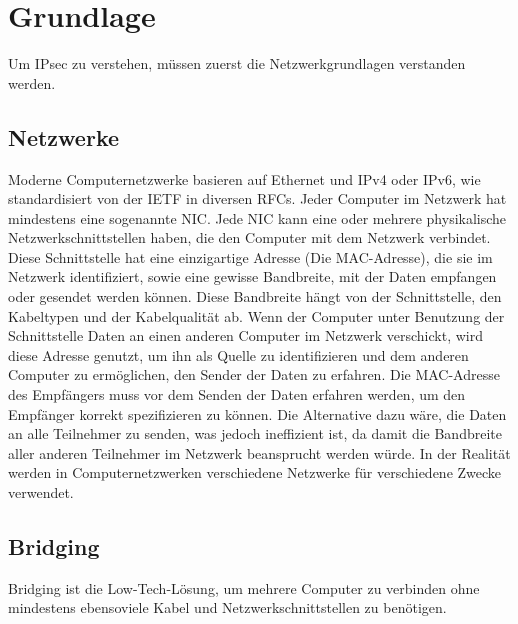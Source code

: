 


\section{Grundlage}
Um IPsec zu verstehen, müssen zuerst die Netzwerkgrundlagen verstanden werden.
\subsection{Netzwerke}
Moderne Computernetzwerke basieren auf Ethernet und \ac{IPv4} oder \ac{IPv6}, wie standardisiert
von der \ac{IETF} in diversen \acp{RFC}.
Jeder Computer im Netzwerk hat mindestens eine sogenannte \ac{NIC}.
Jede \ac{NIC} kann eine oder mehrere physikalische Netzwerkschnittstellen haben,
die den Computer mit dem Netzwerk verbindet. Diese Schnittstelle hat eine einzigartige
Adresse (Die MAC-Adresse), die sie im Netzwerk identifiziert, sowie eine gewisse Bandbreite, mit
der Daten empfangen oder gesendet werden können. Diese Bandbreite hängt von der Schnittstelle, den Kabeltypen und der Kabelqualität ab.
Wenn der Computer unter Benutzung der Schnittstelle Daten an einen anderen Computer im Netzwerk verschickt, wird diese Adresse genutzt, um ihn als
Quelle zu identifizieren und dem anderen Computer zu ermöglichen, den Sender der Daten zu erfahren.
Die MAC-Adresse des Empfängers muss vor dem Senden der Daten erfahren werden, um den Empfänger korrekt spezifizieren zu können.
Die Alternative dazu wäre, die Daten an alle Teilnehmer zu senden, was jedoch ineffizient ist, da
damit die Bandbreite aller anderen Teilnehmer im Netzwerk beansprucht werden würde.
In der Realität werden in Computernetzwerken verschiedene Netzwerke für verschiedene Zwecke verwendet.
\subsection{Bridging}
Bridging ist die Low-Tech-Lösung, um mehrere Computer zu verbinden ohne mindestens ebensoviele
Kabel und Netzwerkschnittstellen zu benötigen.


